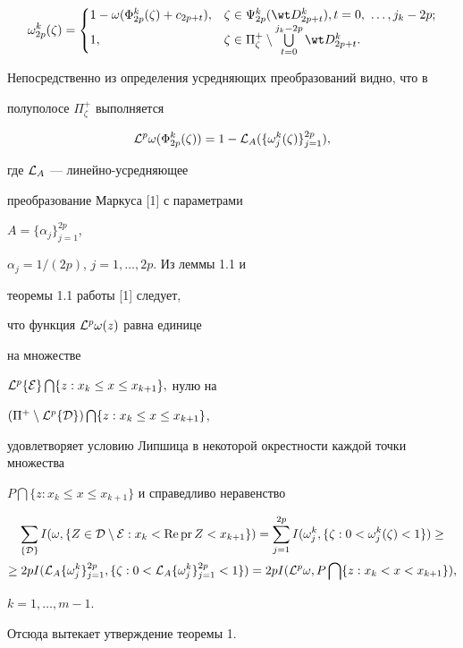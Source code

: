 \begin{pf}
$$


\omega_{2p}^k(\zeta)=


\begin{cases}


1-\omega(\Phi_{2p}^k(\zeta)+c_{2p+t}),


& \zeta\in \Psi_{2p}^k(\wt D_{2p+t}^k),t=0,


\ \dotsc,j_k-2p;\\


1, & \zeta\in \Pi^+_{\zeta}\setminus


\bigcup\limits_{t=0}^{j_k-2p}\wt D_{2p+t}^k.


\end{cases}


$$


Непосредственно из определения усредняющих преобразований видно, что в


полуполосе $\Pi^+_{\zeta}$ выполняется


$$


{\cal L}^p\omega(\Phi_{2p}^k(\zeta))=


1-{\cal L}_A(\{\omega_j^k(\zeta)\}_{j=1}^{2p}),


$$


где ${\cal L}_A$ --- линейно-усредняющее


преобразование Маркуса [1] с параметрами


$A=\{\alpha_j\}_{j=1}^{2p}$,


$\alpha_j=1/(2p)$, $j=1,\dotsc,2p.$ Из леммы 1.1 и


теоремы 1.1 работы [1] следует,


что функция ${\cal L}^p\omega(z)$ равна единице


на множестве


${\cal L}^p\{{\cal E}\}\bigcap\{z:x_k\leq x\leq x_{k+1}\},$ нулю на


$(\Pi^+\setminus {\cal L}^p\{{\cal D}\})\bigcap\{z:x_k\leq x\leq x_{k+1}\}$,


удовлетворяет условию Липшица в некоторой окрестности каждой точки множества


$P\bigcap\{z:x_k\leq x\leq x_{k+1}\}$ и справедливо неравенство


\begin{multline*}


\sum_{\{{\cal D}\}}


I(\omega,\{Z\in{\cal D}\setminus{\cal E}:


x_k<\re \pr Z<x_{k+1}\})=\sum\limits_{j=1}^{2p}


I(\omega_j^k,\{\zeta:0<\omega_j^k(\zeta)<1\})\geq \\


%


\geq 2p I({\cal L}_A\{\omega_j^k\}_{j=1}^{2p},\{\zeta: 0<{\cal


L}_A\{\omega_j^k\}_{j=1}^{2p}<1\})=


2p I({\cal L}^p\omega,P\bigcap\{z:x_k<x<x_{k+1}\}),


\end{multline*}


$k=1,\dotsc,m-1.$


Отсюда вытекает утверждение теоремы 1.


\end{pf}

